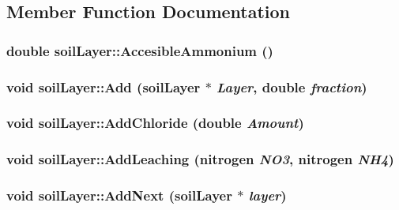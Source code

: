 \subsection{Member Function Documentation}
\hypertarget{classsoil_layer_a879c1862803235bad6caa578cfb2989d}{
\subsubsection[{AccesibleAmmonium}]{\setlength{\rightskip}{0pt plus 5cm}double soilLayer::AccesibleAmmonium ()}}
\label{classsoil_layer_a879c1862803235bad6caa578cfb2989d}
\hypertarget{classsoil_layer_a6dcefc2b3278461493f73971d8885cb7}{
\subsubsection[{Add}]{\setlength{\rightskip}{0pt plus 5cm}void soilLayer::Add ({\bf soilLayer} $\ast$ {\em Layer}, \/  double {\em fraction})}}
\label{classsoil_layer_a6dcefc2b3278461493f73971d8885cb7}
\hypertarget{classsoil_layer_a2de59a5e3a929455c8570915e8297e3b}{
\subsubsection[{AddChloride}]{\setlength{\rightskip}{0pt plus 5cm}void soilLayer::AddChloride (double {\em Amount})}}
\label{classsoil_layer_a2de59a5e3a929455c8570915e8297e3b}
\hypertarget{classsoil_layer_ad66e3bbf7d6898f9528374655d90f482}{
\subsubsection[{AddLeaching}]{\setlength{\rightskip}{0pt plus 5cm}void soilLayer::AddLeaching ({\bf nitrogen} {\em NO3}, \/  {\bf nitrogen} {\em NH4})}}
\label{classsoil_layer_ad66e3bbf7d6898f9528374655d90f482}
\hypertarget{classsoil_layer_a09f4c3dc099147645d71480166261191}{
\subsubsection[{AddNext}]{\setlength{\rightskip}{0pt plus 5cm}void soilLayer::AddNext ({\bf soilLayer} $\ast$ {\em layer})}}

